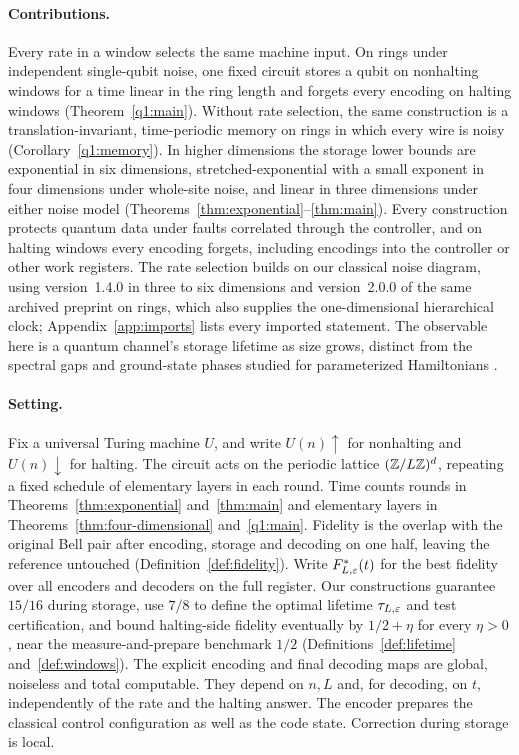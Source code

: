 \paragraph{Contributions.} Every rate in a window selects the same machine input. On rings under independent single-qubit noise, one fixed circuit stores a qubit on nonhalting windows for a time linear in the ring length and forgets every encoding on halting windows (Theorem~\ref{q1:main}). Without rate selection, the same construction is a translation-invariant, time-periodic memory on rings in which every wire is noisy (Corollary~\ref{q1:memory}). In higher dimensions the storage lower bounds are exponential in six dimensions, stretched-exponential with a small exponent in four dimensions under whole-site noise, and linear in three dimensions under either noise model (Theorems~\ref{thm:exponential}--\ref{thm:main}). Every construction protects quantum data under faults correlated through the controller, and on halting windows every encoding forgets, including encodings into the controller or other work registers. The rate selection builds on our classical noise diagram, using version~1.4.0 \cite{DMNoise2026} in three to six dimensions and version~2.0.0 \cite{DMNoise1D2026} of the same archived preprint on rings, which also supplies the one-dimensional hierarchical clock; Appendix~\ref{app:imports} lists every imported statement. The observable here is a quantum channel's storage lifetime as size grows, distinct from the spectral gaps and ground-state phases studied for parameterized Hamiltonians \cite{BCW2021,CPGW2015}.

\paragraph{Setting.} Fix a universal Turing machine \(U\), and write \(U(n)\uparrow\) for nonhalting and \(U(n)\downarrow\) for halting. The circuit acts on the periodic lattice \((\mathbb Z/L\mathbb Z)^d\), repeating a fixed schedule of elementary layers in each round. Time counts rounds in Theorems~\ref{thm:exponential} and~\ref{thm:main} and elementary layers in Theorems~\ref{thm:four-dimensional} and~\ref{q1:main}. Fidelity is the overlap with the original Bell pair after encoding, storage and decoding on one half, leaving the reference untouched (Definition~\ref{def:fidelity}). Write \(F^*_{L,\varepsilon}(t)\) for the best fidelity over all encoders and decoders on the full register. Our constructions guarantee \(15/16\) during storage, use \(7/8\) to define the optimal lifetime \(\tau_{L,\varepsilon}\) and test certification, and bound halting-side fidelity eventually by \(1/2+\eta\) for every \(\eta>0\), near the measure-and-prepare benchmark \(1/2\) (Definitions~\ref{def:lifetime} and~\ref{def:windows}). The explicit encoding and final decoding maps are global, noiseless and total computable. They depend on \(n,L\) and, for decoding, on \(t\), independently of the rate and the halting answer. The encoder prepares the classical control configuration as well as the code state. Correction during storage is local.

